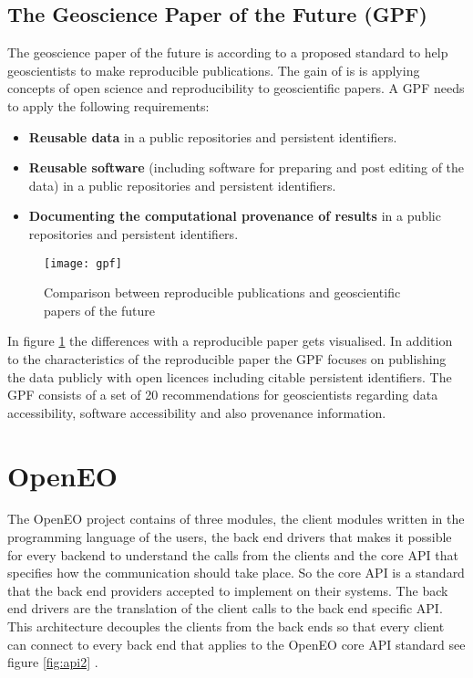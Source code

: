 \documentclass[draft,final]{vutinfth} %
\begin{document}
\subsection{The Geoscience Paper of the Future (GPF)}\label{GPF}
The geoscience paper of the future is according to \cite{Gil2016TowardTG} a proposed standard to help geoscientists to make reproducible publications. The gain of is is applying concepts of open science and reproducibility to geoscientific papers. A GPF needs to apply the following requirements:

\begin{itemize}
	\item \textbf{Reusable data} in a public repositories and persistent identifiers.
	\item \textbf{Reusable software} (including software for preparing and post editing of the data) in a  public repositories and persistent identifiers.
	\item \textbf{Documenting the computational provenance of results} in a public repositories and persistent identifiers.  
\end{itemize}

\begin{figure}[h]
	\centering
	\texttt{[image: gpf]}
	\caption{Comparison between reproducible publications and geoscientific papers of the future \cite{Gil2016TowardTG}}
	\label{fig:gpf} %
\end{figure}

In figure \ref{fig:gpf} the differences with a reproducible paper gets visualised. In addition to the characteristics of the reproducible paper the GPF focuses on publishing the data publicly with open licences including citable persistent identifiers.
The GPF consists of a set of 20 recommendations for geoscientists regarding data accessibility, software accessibility and also provenance information. 


\section{OpenEO}\label{OpenEO}
The OpenEO project contains of three modules, the client modules written in the programming language of the users, the back end drivers that makes it possible for every backend to understand the calls from the clients and the core API that specifies how the communication should take place. So the core API is a standard that the back end providers accepted to implement on their systems. The back end drivers are the translation of the client calls to the back end specific API. This architecture decouples the clients from the back ends so that every client can connect to every back end that applies to the OpenEO core API standard see figure \ref{fig:api2} \cite{openeo}.   
\end{document}
